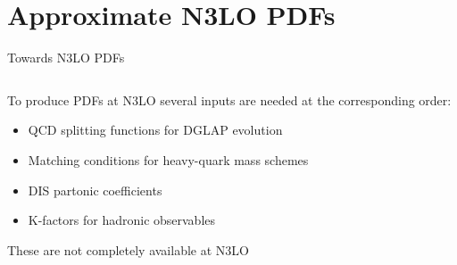 \documentclass[aspectratio=169, 8pt,t]{beamer}
\begin{document}
\section*{Approximate N3LO PDFs}

\begin{frame}{Towards N3LO PDFs}
  \begin{columns}[T]
    \begin{column}{0.59\textwidth}
      To produce PDFs at N3LO several inputs are needed at the corresponding order:
      \begin{itemize}
        \item QCD splitting functions for DGLAP evolution
        \item Matching conditions for heavy-quark mass schemes
        \item DIS partonic coefficients
        \item K-factors for hadronic observables
      \end{itemize}
    
      These are not completely available at N3LO
    

\end{column}
\end{columns}
\end{frame}
\end{document}
